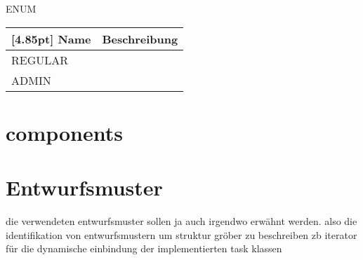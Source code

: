     		ENUM
                \begin{center}
                	\renewcommand{\arraystretch}{1.5}
    	            \setlength\tabcolsep{5pt}
                	\begin{tabularx}{\textwidth}{|l|X|}
                		\hline
                        \rowcolor[gray]{0.75}[4.85pt]
                	    Name & Beschreibung \\ \hline
                		REGULAR &  \\ \hline
                		ADMIN &  \\ \hline
                	\end{tabularx}
                \end{center}
    
        \section{components}
	
	\section{Entwurfsmuster}
	die verwendeten entwurfsmuster sollen ja auch irgendwo erwähnt werden.
	also die identifikation von entwurfsmustern um struktur gröber zu beschreiben
	zb iterator für die dynamische einbindung der implementierten task klassen
